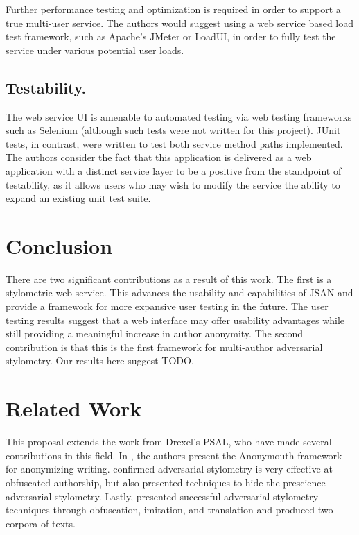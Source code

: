 \documentclass[letterpaper]{article}
\begin{document}
Further performance testing and optimization is required in order to
support a true multi-user service. The authors would suggest using a
web service based load test framework, such as Apache's JMeter or
LoadUI, in order to fully test the service under various potential
user loads.

\subsection{Testability.}

The web service UI is amenable to automated testing via web testing
frameworks such as Selenium (although such tests were not written for
this project). JUnit tests, in contrast, were written to test both
service method paths implemented. The authors consider the fact that
this application is delivered as a web application with a distinct
service layer to be a positive from the standpoint of testability, as
it allows users who may wish to modify the service the ability to
expand an existing unit test suite.

\section{Conclusion}

There are two significant contributions as a result of this work.  The
first is a stylometric web service.  This advances the usability
and capabilities of JSAN and provide a framework for more expansive
user testing in the future. The user testing results suggest that a
web interface may offer usability advantages while still providing a
meaningful increase in author anonymity.  The second contribution is that this is
the first framework for multi-author adversarial stylometry.  Our
results here suggest TODO.

\section*{Related Work}\label{sec:related}
This proposal extends the work from Drexel's PSAL, who have made
several contributions in this field.  In
\cite{conf/pet/McDonaldACSG12}, the authors present the Anonymouth
framework for anonymizing writing.
\cite{Afroz:2012:DHF:2310656.2310711} confirmed adversarial stylometry
is very effective at obfuscated authorship, but also presented
techniques to hide the prescience adversarial stylometry.  Lastly,
\cite{journals/tissec/BrennanAG12} presented successful adversarial
stylometry techniques through obfuscation, imitation, and translation
and produced two corpora of texts.
\end{document}

